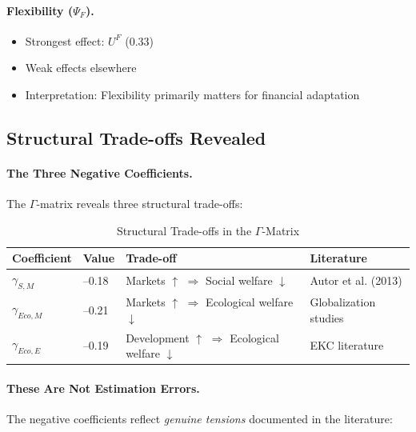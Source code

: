 \paragraph{Flexibility ($\Psi_F$).}
\begin{itemize}
\item Strongest effect: $U^F$ (0.33)
\item Weak effects elsewhere
\item Interpretation: Flexibility primarily matters for financial adaptation
\end{itemize}

\subsection{Structural Trade-offs Revealed}

\paragraph{The Three Negative Coefficients.}
The $\Gamma$-matrix reveals three structural trade-offs:

\begin{table}[htbp]
\centering
\caption{Structural Trade-offs in the $\Gamma$-Matrix}
\label{tab:app-c-tradeoffs}
\renewcommand{\arraystretch}{1.4}
\begin{tabular}{@{}llll@{}}
\toprule
\textbf{Coefficient} & \textbf{Value} & \textbf{Trade-off} & \textbf{Literature} \\
\midrule
$\gamma_{S,M}$ & --0.18 & Markets $\uparrow$ $\Rightarrow$ Social welfare $\downarrow$ & Autor et al. (2013) \\
$\gamma_{Eco,M}$ & --0.21 & Markets $\uparrow$ $\Rightarrow$ Ecological welfare $\downarrow$ & Globalization studies \\
$\gamma_{Eco,E}$ & --0.19 & Development $\uparrow$ $\Rightarrow$ Ecological welfare $\downarrow$ & EKC literature \\
\bottomrule
\end{tabular}
\end{table}

\paragraph{These Are Not Estimation Errors.}
The negative coefficients reflect \emph{genuine tensions} documented in the literature:

